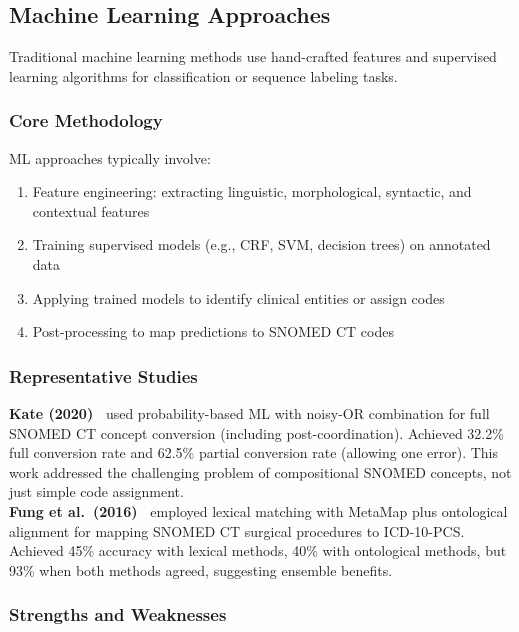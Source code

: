 \subsection{Machine Learning Approaches}

Traditional machine learning methods use hand-crafted features and supervised learning algorithms for classification or sequence labeling tasks.

\subsubsection{Core Methodology}

ML approaches typically involve:
\begin{enumerate}
    \item Feature engineering: extracting linguistic, morphological, syntactic, and contextual features
    \item Training supervised models (e.g., CRF, SVM, decision trees) on annotated data
    \item Applying trained models to identify clinical entities or assign codes
    \item Post-processing to map predictions to SNOMED CT codes
\end{enumerate}

\subsubsection{Representative Studies}

\textbf{Kate (2020)~\cite{Kate:2020}} used probability-based ML with noisy-OR combination for full SNOMED CT concept conversion (including post-coordination). Achieved 32.2\% full conversion rate and 62.5\% partial conversion rate (allowing one error). This work addressed the challenging problem of compositional SNOMED concepts, not just simple code assignment.\\

\textbf{Fung et al.~(2016)~\cite{Fung:2016}} employed lexical matching with MetaMap plus ontological alignment for mapping SNOMED CT surgical procedures to ICD-10-PCS. Achieved 45\% accuracy with lexical methods, 40\% with ontological methods, but 93\% when both methods agreed, suggesting ensemble benefits.\\

\subsubsection{Strengths and Weaknesses}

